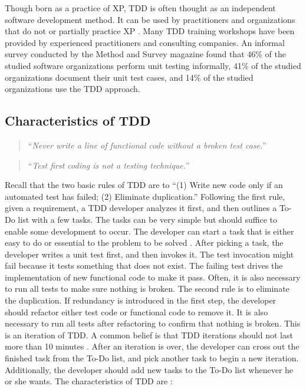 Though born as a practice of XP, TDD is often thought as an independent 
software development method. It can be used by practitioners and 
organizations that do not or partially practice XP 
\cite{Beck:03,TestDrivenWeb,TddYahooGroup}. Many TDD training workshops 
\cite{OsheroveWorkshop:04,ClarkwareWorkshop:04,
AdaptionTddWorkshop,IndustrialLogicTddWorkshop,TestDrivenDotComWeblogs,
BENUGWorkshop:04} have been provided by experienced practitioners 
and consulting companies. An informal 
survey \cite{UnitTestingPoll:06} conducted by the Method and 
Survey magazine found that 46\% of the studied software 
organizations perform unit testing informally, 41\% of the 
studied organizations document their unit test cases, and 
14\% of the studied organizations use the TDD approach.

\subsection{Characteristics of TDD}
\begin{quotation}
``\textit{Never write a line of functional code without a broken test case.}''

\end{quotation}
\begin{quotation}
``\textit{Test first coding is not a testing technique.}'' 

\end{quotation}

Recall that the two basic rules of TDD are to ``(1) Write new code 
only if an automated test has failed; (2) Eliminate duplication.''
Following the first rule, given a requirement, a TDD developer 
analyzes it first, and then outlines a To-Do list with a few tasks. 
The tasks can be very simple but should suffice to enable some 
development to occur. The developer can start a task that is either easy 
to do or essential to the problem to be solved 
\cite{Astels:03, Beck:03}. After picking a task, the developer 
writes a unit test first, and then invokes it. The test invocation 
might fail because it tests something that does not exist. The 
failing test drives the implementation of new functional code
to make it pass. Often, it is also necessary to run all tests to
make sure nothing is broken. The second rule is to eliminate
the duplication. If redundancy is introduced in the first
step, the developer should refactor either test code or functional
code to remove it. It is also necessary to run all tests 
after refactoring to confirm that nothing is broken. This 
is an iteration of TDD. A common belief is that TDD iterations 
should not last more than 10 minutes \cite{TDDRhythm}. 
After an iteration is over, the developer can cross out the
finished task from the To-Do list, and pick another task  
to begin a new iteration. Additionally, the developer should
add new tasks to the To-Do list whenever he or she wants. The 
characteristics of TDD are :
